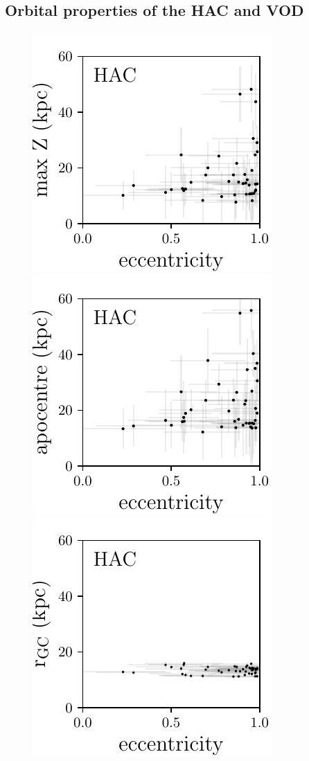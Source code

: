 \documentclass[fleqn,usenatbib]{mnras}
\begin{document}
\subsection{Orbital properties of the HAC and VOD}
%
\begin{figure}
	\includegraphics[scale=0.473]{HAC_orbits_ecc_z.pdf}
    \includegraphics[scale=0.473]{HAC_orbits_apo_ecc.pdf} 
  \includegraphics[scale=0.473]{HAC_orbits_ecc_r.pdf} \\

\end{figure}
\end{document}
